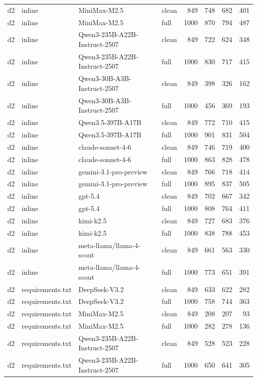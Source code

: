 \begin{tabular}{llllrrrr}
d2 & inline & MiniMax-M2.5 & clean & 849 & 748 & 682 & 401 \\
d2 & inline & MiniMax-M2.5 & full & 1000 & 870 & 794 & 487 \\
d2 & inline & Qwen3-235B-A22B-Instruct-2507 & clean & 849 & 722 & 624 & 348 \\
d2 & inline & Qwen3-235B-A22B-Instruct-2507 & full & 1000 & 830 & 717 & 415 \\
d2 & inline & Qwen3-30B-A3B-Instruct-2507 & clean & 849 & 398 & 326 & 162 \\
d2 & inline & Qwen3-30B-A3B-Instruct-2507 & full & 1000 & 456 & 369 & 193 \\
d2 & inline & Qwen3.5-397B-A17B & clean & 849 & 772 & 710 & 415 \\
d2 & inline & Qwen3.5-397B-A17B & full & 1000 & 901 & 831 & 504 \\
d2 & inline & claude-sonnet-4-6 & clean & 849 & 746 & 719 & 400 \\
d2 & inline & claude-sonnet-4-6 & full & 1000 & 863 & 828 & 478 \\
d2 & inline & gemini-3.1-pro-preview & clean & 849 & 766 & 718 & 414 \\
d2 & inline & gemini-3.1-pro-preview & full & 1000 & 895 & 837 & 505 \\
d2 & inline & gpt-5.4 & clean & 849 & 702 & 667 & 342 \\
d2 & inline & gpt-5.4 & full & 1000 & 808 & 764 & 411 \\
d2 & inline & kimi-k2.5 & clean & 849 & 727 & 683 & 376 \\
d2 & inline & kimi-k2.5 & full & 1000 & 838 & 788 & 453 \\
d2 & inline & meta-llama/llama-4-scout & clean & 849 & 661 & 563 & 330 \\
d2 & inline & meta-llama/llama-4-scout & full & 1000 & 773 & 651 & 391 \\
d2 & requirements.txt & DeepSeek-V3.2 & clean & 849 & 633 & 622 & 282 \\
d2 & requirements.txt & DeepSeek-V3.2 & full & 1000 & 758 & 744 & 363 \\
d2 & requirements.txt & MiniMax-M2.5 & clean & 849 & 208 & 207 & 93 \\
d2 & requirements.txt & MiniMax-M2.5 & full & 1000 & 282 & 278 & 136 \\
d2 & requirements.txt & Qwen3-235B-A22B-Instruct-2507 & clean & 849 & 528 & 523 & 228 \\
d2 & requirements.txt & Qwen3-235B-A22B-Instruct-2507 & full & 1000 & 650 & 641 & 305 \\

\end{tabular}
